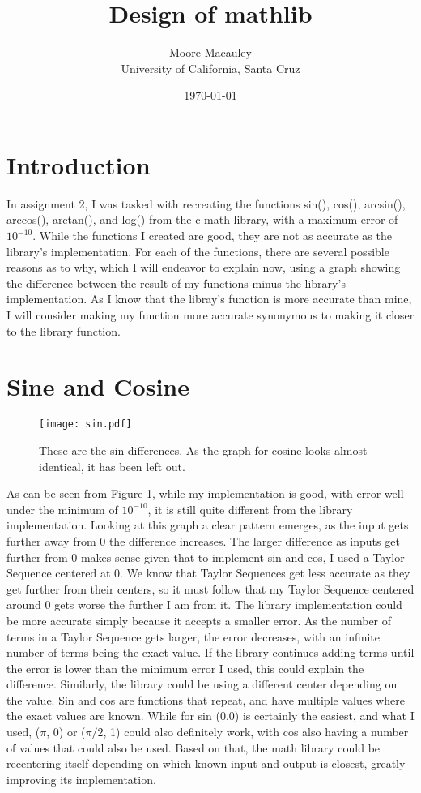 \documentclass[11pt]{article}
\title{Design of mathlib}
\author{Moore Macauley \\ University of California, Santa Cruz}
\date{\today}
\begin{document}
\maketitle
\section{Introduction}
In assignment 2, I was tasked with recreating the functions sin(), cos(), arcsin(), arccos(), arctan(), and log() from the c math library, with a maximum error of $10^{-10}$. While the functions I created are good, they are not as accurate as the library's implementation. For each of the functions, there are several possible reasons as to why, which I will endeavor to explain now, using a graph showing the difference between the result of my functions minus the library's implementation. As I know that the libray's function is more accurate than mine, I will consider making my function more accurate synonymous to making it closer to the library function.

\section{Sine and Cosine}
    \begin{figure}[tbp]
    \begin{centering}
    \texttt{[image: sin.pdf]}
    \caption{These are the sin differences. As the graph for cosine looks almost identical, it has been left out.}
    \end{centering}
\end{figure}

As can be seen from Figure 1, while my implementation is good, with error well under the minimum of $10^{-10}$, it is still quite different from the library implementation. Looking at this graph a clear pattern emerges, as the input gets further away from 0 the difference increases. The larger difference as inputs get further from 0 makes sense given that to implement sin and cos, I used a Taylor Sequence centered at 0. We know that Taylor Sequences get less accurate as they get further from their centers, so it must follow that my Taylor Sequence centered around 0 gets worse the further I am from it. The library implementation could be more accurate simply because it accepts a smaller error. As the number of terms in a Taylor Sequence gets larger, the error decreases, with an infinite number of terms being the exact value. If the library continues adding terms until the error is lower than the minimum error I used, this could explain the difference. Similarly, the library could be using a different center depending on the value. Sin and cos are functions that repeat, and have multiple values where the exact values are known. While for sin (0,0) is certainly the easiest, and what I used, ($\pi$, 0) or ($\pi/2$, 1) could also definitely work, with cos also having a number of values that could also be used. Based on that, the math library could be recentering itself depending on which known input and output is closest, greatly improving its implementation.
\end{document}
